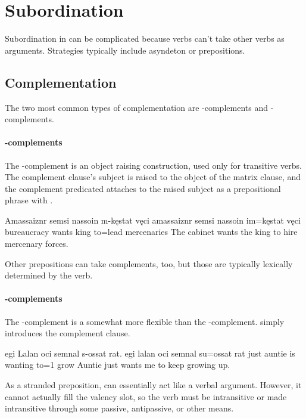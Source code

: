 \section{Subordination}
Subordination in \langname{} can be complicated because verbs can't take other verbs as arguments. Strategies typically include asyndeton or prepositions.

\subsection{Complementation}
The two most common types of complementation are -complements and -complements.

\paragraph{-complements}
The -complement is an object raising construction, used only for transitive verbs. The complement clause's subject is raised to the object of the matrix clause, and the complement predicated attaches to the raised subject as a prepositional phrase with .

\begin{example}
    \script Amassaiznr semsi nassoin m-kęstat vęci
    \bits amassaiznr semsi nassoin im=kęstat vęci
    \gloss bureaucracy wants king to=lead mercenaries
    \tr The cabinet wants the king to hire mercenary forces.
\end{example}

Other prepositions can take complements, too, but those are typically lexically determined by the verb.

\paragraph{-complements}
The -complement is a somewhat more flexible than the -complement.  simply introduces the complement clause.

\begin{example}
    \script egi Lalan oci semnal s-ossat rat.
    \bits egi  lalan  oci semnal  su=ossat rat
    \gloss just auntie is wanting to=1 grow
    \tr Auntie just wants me to keep growing up.
\end{example}

As a stranded preposition,  can essentially act like a verbal argument. However, it cannot actually fill the valency slot, so the verb must be intransitive or made intransitive through some passive, antipassive, or other means.

